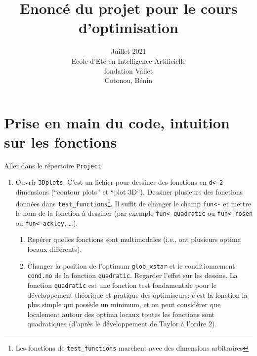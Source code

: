 \documentclass[12pt]{article}
\title{Enoncé du projet pour le cours d'optimisation}
\date{Juillet 2021 \\
Ecole d'Eté en Intelligence Artificielle \\
fondation Vallet\\
Cotonou, Bénin}
\author{}
\begin{document}
\maketitle

\section*{Prise en main du code, intuition sur les fonctions}
Aller dans le répertoire \texttt{Project}. 
\begin{enumerate}

\item Ouvrir \texttt{3Dplots}. C'est un fichier pour dessiner des fonctions en \texttt{d<-2} dimensions (``contour plots'' et ``plot 3D''). 
Dessiner plusieurs des fonctions données dans \texttt{test\_functions}\footnote{Les fonctions de \texttt{test\_functions} marchent avec des dimensions arbitraires}.
Il suffit de changer le champ \texttt{fun<-} et mettre le nom de la fonction à dessiner
(par exemple \texttt{fun<-quadratic} ou \texttt{fun<-rosen} ou \texttt{fun<-ackley}, \ldots). \\
\begin{enumerate}
\item Repérer quelles fonctions sont multimodales (i.e., ont plusieurs optima locaux différents).
\item Changer la position de l'optimum \texttt{glob\_xstar} et le conditionnement \texttt{cond.no} de la fonction \texttt{quadratic}. Regarder l'effet sur les dessins. La fonction \texttt{quadratic} est une fonction test fondamentale pour le développement théorique et pratique des optimiseurs: 
c'est la fonction la plus simple qui possède un minimum, et on peut considérer que localement autour des optima locaux toutes les fonctions sont quadratiques (d'après le développement de Taylor à l'ordre 2).
\end{enumerate}


\end{enumerate}
\end{document}

